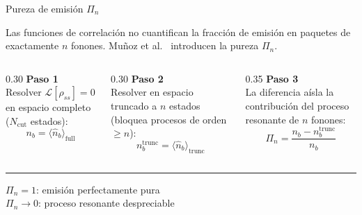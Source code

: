 \documentclass[
11pt,notheorems,hyperref={pdfauthor=whatever}
]{beamer}
\begin{document}
\begin{frame}{Pureza de emisión $\Pi_n$}
	
	\vspace{-20pt}
	{\small Las funciones de correlación no cuantifican la fracción
		de emisión en paquetes de exactamente $n$ fonones. Muñoz et al.\ \cite{munoz2014,munoz2018}
		introducen la pureza $\Pi_n$.}

	\vspace{40pt}
	
	\begin{columns}[T]
		
		\begin{column}{0.30\textwidth}
			\textbf{Paso 1}\\[6pt]
			{\small
				Resolver $\mathcal{L}[\rho_{ss}]=0$
				en espacio completo
				($N_\mathrm{cut}$ estados):
				\begin{equation*}
					n_b = \langle\hat{n}_b\rangle_\mathrm{full}
				\end{equation*}
			}
		\end{column}
		
		\begin{column}{0.30\textwidth}
			\textbf{Paso 2}\\[6pt]
			{\small
				Resolver en espacio truncado
				a $n$ estados (bloquea
				procesos de orden $\geq n$):
				\begin{equation*}
					n_b^\mathrm{trunc} =
					\langle\hat{n}_b\rangle_\mathrm{trunc}
				\end{equation*}
			}
		\end{column}
		
		\begin{column}{0.35\textwidth}
			\textbf{Paso 3}\\[6pt]
			{\small
				La diferencia aísla la
				contribución del proceso
				resonante de $n$ fonones:
				\begin{equation*}
					\boxed{
						\Pi_n =
						\frac{n_b - n_b^\mathrm{trunc}}
						{n_b}
					}
				\end{equation*}
			}
		\end{column}
		
	\end{columns}
	
	\vspace{20pt}
	\rule{\textwidth}{0.4pt}
	\vspace{4pt}
	
	\begin{center}
			{\small
			$\Pi_n = 1$: emisión perfectamente pura\\
			$\Pi_n \to 0$: proceso resonante despreciable
		}
	\end{center}
	
\end{frame}
\end{document}
